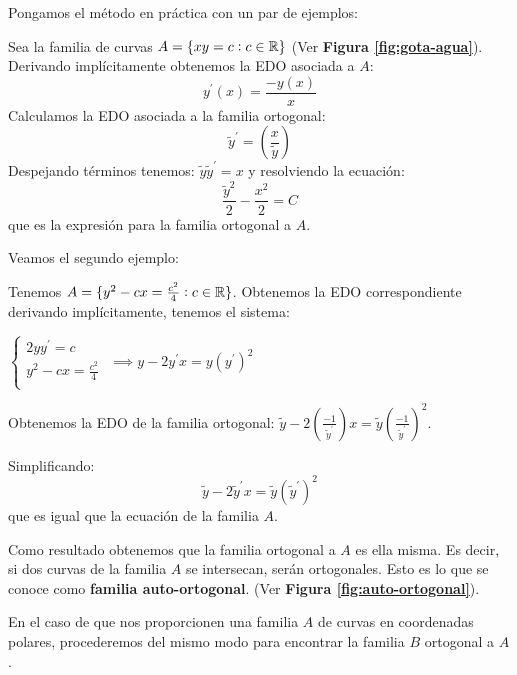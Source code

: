\documentclass{mathnotes}
\begin{document}
Pongamos el método en práctica con un par de ejemplos:


\begin{example}
Sea la familia de curvas $A = \{ xy = c : c\in \mathbb{R} \}$ (Ver \textbf{Figura \ref{fig:gota-agua}}).
Derivando implícitamente obtenemos la EDO asociada a $A$:
$$y^\prime(x) = \frac{-y(x)}{x}$$
Calculamos la EDO asociada a la familia ortogonal:
$$\tilde{y}^\prime=(\frac{x}{\tilde{y}})$$
Despejando términos tenemos: $\tilde{y}\tilde{y}^\prime = x$ y resolviendo la ecuación:
$$\frac{\tilde{y}^2}{2}-\frac{x^2}{2} = C$$
que es la expresión para la familia ortogonal a $A$.
\end{example}

Veamos el segundo ejemplo:


\begin{example}
Tenemos $A=\{ y^2-cx=\frac{c^2}{4} : c\in \mathbb{R} \}$.
Obtenemos la EDO correspondiente derivando implícitamente, tenemos el sistema:

\begin{center}
$
  \left\lbrace
  \begin{array}{l}
     2yy^\prime = c \\
     y^2-cx = \frac{c^2}{4} \\
  \end{array}
  \right.
$
$\implies y-2y^\prime x = y(y^\prime)^2$
\end{center}
Obtenemos la EDO de la familia ortogonal: $\tilde{y}-2(\frac{-1}{\tilde{y}^\prime})x=\tilde{y}(\frac{-1}{\tilde{y}^\prime})^2$. 

Simplificando: $$\tilde{y}-2\tilde{y}^\prime x = \tilde{y}(\tilde{y}^\prime)^2$$ que es igual que la ecuación de la familia $A$.

Como resultado obtenemos que la familia ortogonal a $A$ es ella misma. Es decir, si dos curvas de la familia $A$ se intersecan, serán ortogonales. Esto es lo que se conoce como \textbf{familia auto-ortogonal}. (Ver \textbf{Figura \ref{fig:auto-ortogonal}}).
\end{example}

En el caso de que nos proporcionen una familia $A$ de curvas en coordenadas polares, procederemos del mismo modo para encontrar la familia  $B$ ortogonal a $A$. 
\end{document}
